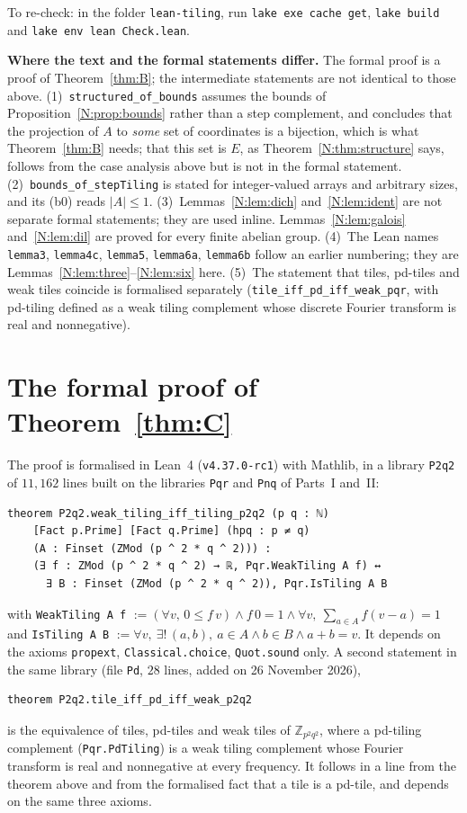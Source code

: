 \documentclass[11pt,a4paper]{amsart}
\theoremstyle{definition}
\theoremstyle{remark}
\newcommand{\Z}{\mathbb{Z}}
\newcommand{\lean}[1]{\texttt{#1}}
\begin{document}
\medskip
\noindent To re-check: in the folder \texttt{lean-tiling}, run \texttt{lake exe cache get}, \texttt{lake build}
and \texttt{lake env lean Check.lean}.

\medskip
{\sloppy\noindent\textbf{Where the text and the formal statements differ.} The formal proof is a proof of
Theorem~\ref{thm:B}; the intermediate statements are not identical to those above.
(1)~\lean{structured\_of\_bounds} assumes the bounds of Proposition~\ref{N:prop:bounds} rather than a step
complement, and concludes that the projection of $A$ to \emph{some} set of coordinates is a bijection, which is
what Theorem~\ref{thm:B} needs; that this set is $E$, as Theorem~\ref{N:thm:structure} says, follows from the
case analysis above but is not in the formal statement.
(2)~\lean{bounds\_of\_stepTiling} is stated for integer-valued arrays and arbitrary sizes, and its (b0) reads
$|A|\le 1$.
(3)~Lemmas~\ref{N:lem:dich} and~\ref{N:lem:ident} are not separate formal statements; they are used inline.
Lemmas~\ref{N:lem:galois} and~\ref{N:lem:dil} are proved for every finite abelian group.
(4)~The Lean names \lean{lemma3}, \lean{lemma4c}, \lean{lemma5}, \lean{lemma6a}, \lean{lemma6b} follow an earlier
numbering; they are Lemmas~\ref{N:lem:three}--\ref{N:lem:six} here.
(5)~The statement that tiles, pd-tiles and weak tiles coincide is formalised separately
(\lean{tile\_iff\_pd\_iff\_weak\_pqr}, with pd-tiling defined as a weak tiling complement whose discrete Fourier
transform is real and nonnegative).\par}

\section{The formal proof of Theorem~\ref{thm:C}}\label{C:sec:lean}

The proof is formalised in Lean~4 (\texttt{v4.37.0-rc1}) with Mathlib, in a library \lean{P2q2} of $11{,}162$
lines built on the libraries \lean{Pqr} and \lean{Pnq} of Parts~I and~II:
\begin{verbatim}
theorem P2q2.weak_tiling_iff_tiling_p2q2 (p q : ℕ)
    [Fact p.Prime] [Fact q.Prime] (hpq : p ≠ q)
    (A : Finset (ZMod (p ^ 2 * q ^ 2))) :
    (∃ f : ZMod (p ^ 2 * q ^ 2) → ℝ, Pqr.WeakTiling A f) ↔
      ∃ B : Finset (ZMod (p ^ 2 * q ^ 2)), Pqr.IsTiling A B
\end{verbatim}
with \lean{WeakTiling A f} $:=(\forall v,\,0\le f\,v)\wedge f\,0=1\wedge\forall v,\ \sum_{a\in A}f(v-a)=1$ and
\lean{IsTiling A B} $:=\forall v,\ \exists!\,(a,b),\ a\in A\wedge b\in B\wedge a+b=v$. It depends on the axioms
\lean{propext}, \lean{Classical.choice}, \lean{Quot.sound} only. A second statement in the same library (file
\lean{Pd}, $28$ lines, added on 26 November 2026),
\begin{verbatim}
theorem P2q2.tile_iff_pd_iff_weak_p2q2
\end{verbatim}
is the equivalence of tiles, pd-tiles and weak tiles of $\Z_{p^2q^2}$, where a pd-tiling complement
(\lean{Pqr.PdTiling}) is a weak tiling complement whose Fourier transform is real and nonnegative at every
frequency. It follows in a line from the theorem above and from the formalised fact that a tile is a pd-tile,
and depends on the same three axioms.
\end{document}
